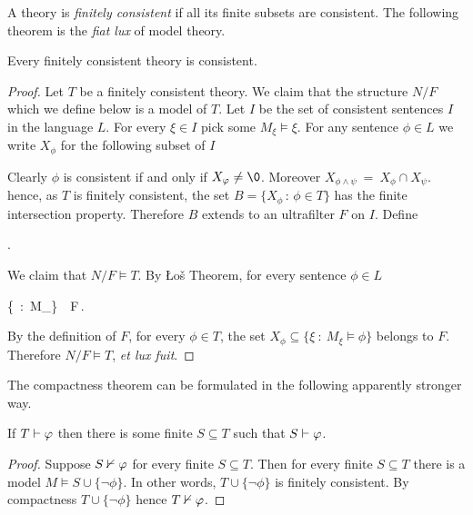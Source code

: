 \documentclass[creche.tex]{subfiles}
\begin{document}
A theory is \emph{finitely consistent\/} if all its finite subsets are consistent. The following theorem is the \textit{fiat lux\/} of model theory. 

\begin{void_thm}\label{thmcompattezza}
Every finitely consistent theory is consistent. 
\end{void_thm}

\begin{proof}
Let  $T$ be a finitely consistent theory. We claim that the structure $N/F$ which we define below is a model of $T$. Let $I$ be the set of consistent sentences $I$ in the language $L$. For every $\xi\in I$ pick some $M_\xi\models\xi$. For any sentence $\phi\in L$ we write $X_\phi$ for the following subset of $I$


Clearly $\phi$ is consistent if and only if $X_\phi\neq\0$. Moreover $X_{\phi\wedge\psi}\ =\ X_\phi\cap X_\psi$. hence, as $T$ is finitely consistent, the set $B=\big\{X_\phi\,:\,\phi\in T\big\}$ has the finite intersection property. Therefore $B$ extends to an ultrafilter $F$ on $I$. Define

.

We claim that $N/F\models T$. By \L o\v{s} Theorem, for every sentence $\phi\in L$

%
{\IFF}%
{\Big\{\xi\ :\ M_\xi\models\phi\Big\}\ \in\ F\,.}

By the definition of $F$, for every $\phi\in T$, the set $X_\phi\subseteq \big\{\xi\ :\ M_\xi\models \phi\big\}$ belongs to $F$. Therefore $N/F\models T$, \textit{et lux fuit}.
\end{proof}

The compactness theorem can be formulated in the following apparently stronger way.

\begin{corollary}\label{compattezza2}
If $T\vdash\varphi$ then there is some finite $S\subseteq T$ such that $S\vdash\varphi$.
\end{corollary}

\begin{proof}
Suppose $S\nvdash\varphi$ for every finite $S\subseteq T$. Then for every finite $S\subseteq T$ there is a model $M\models S\cup\{\neg\phi\}$. In other words, $T\cup\{\neg\phi\}$ is finitely consistent. By compactness $T\cup\{\neg\phi\}$ hence $T\nvdash \varphi$.
\end{proof}
\end{document}
